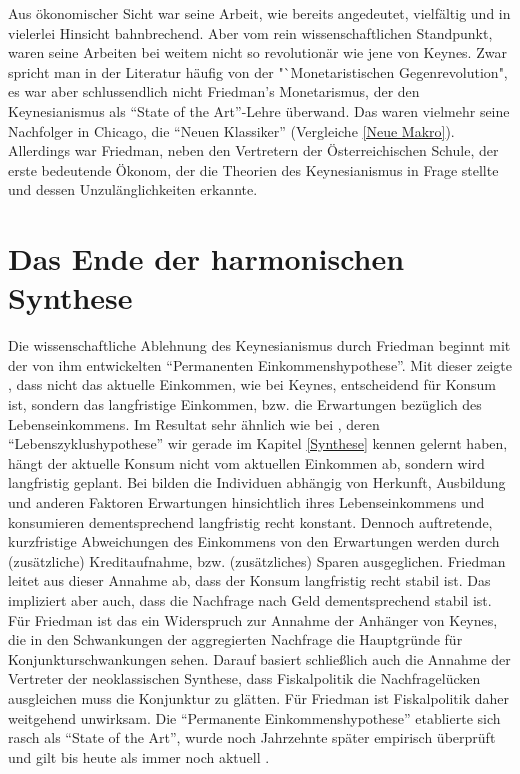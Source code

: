 Aus ökonomischer Sicht war seine Arbeit, wie bereits angedeutet, vielfältig und in vielerlei Hinsicht bahnbrechend. Aber vom rein wissenschaftlichen Standpunkt, waren seine Arbeiten bei weitem nicht so revolutionär wie jene von Keynes. Zwar spricht man in der Literatur häufig von der "`Monetaristischen Gegenrevolution", es war aber schlussendlich nicht Friedman's Monetarismus, der den Keynesianismus als "`State of the Art"'-Lehre überwand. Das waren vielmehr seine Nachfolger in Chicago, die "`Neuen Klassiker"' (Vergleiche \ref{Neue Makro}). Allerdings war Friedman, neben den Vertretern der Österreichischen Schule, der erste bedeutende Ökonom, der die Theorien des Keynesianismus in Frage stellte und dessen Unzulänglichkeiten erkannte.


\section{Das Ende der harmonischen Synthese}

Die wissenschaftliche Ablehnung des Keynesianismus durch Friedman beginnt mit der von ihm entwickelten "`Permanenten Einkommenshypothese"'. Mit dieser zeigte \textcite{Friedman1957}, dass nicht das aktuelle Einkommen, wie bei Keynes, entscheidend für Konsum ist, sondern das langfristige Einkommen, bzw. die Erwartungen bezüglich des Lebenseinkommens. Im Resultat sehr ähnlich wie bei \textcite{Modigliani1954}, deren "`Lebenszyklushypothese"' wir gerade im Kapitel \ref{Synthese} kennen gelernt haben, hängt der aktuelle Konsum nicht vom aktuellen Einkommen ab, sondern wird langfristig geplant. Bei \textcite{Friedman1957} bilden die Individuen abhängig von Herkunft, Ausbildung und anderen Faktoren Erwartungen hinsichtlich ihres Lebenseinkommens und konsumieren dementsprechend langfristig recht konstant. Dennoch auftretende, kurzfristige Abweichungen des Einkommens von den Erwartungen werden durch (zusätzliche) Kreditaufnahme, bzw. (zusätzliches) Sparen ausgeglichen. Friedman leitet aus dieser Annahme ab, dass der Konsum langfristig recht stabil ist. Das impliziert aber auch, dass  die Nachfrage nach Geld dementsprechend stabil ist. Für Friedman ist das ein Widerspruch zur Annahme der Anhänger von Keynes, die in den Schwankungen der aggregierten Nachfrage die Hauptgründe für Konjunkturschwankungen sehen. Darauf basiert schließlich auch die Annahme der Vertreter der neoklassischen Synthese, dass Fiskalpolitik die Nachfragelücken ausgleichen muss die Konjunktur zu glätten. Für Friedman ist Fiskalpolitik daher weitgehend unwirksam. Die "`Permanente Einkommenshypothese"' etablierte sich rasch als "`State of the Art"', wurde noch Jahrzehnte später empirisch überprüft und gilt bis heute als immer noch aktuell \parencite{Bernanke1984, Mankiw1985}.  

